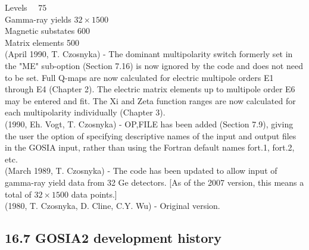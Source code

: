 \documentclass[10pt]{article}
\begin{document}
Levels $\quad 75$\\
Gamma-ray yields $32 \times 1500$\\
Magnetic substates 600\\
Matrix elements 500\\
(April 1990, T. Czosnyka) - The dominant multipolarity switch formerly set in the "ME" sub-option (Section 7.16) is now ignored by the code and does not need to be set. Full Q-maps are now calculated for electric multipole orders E1 through E4 (Chapter 2). The electric matrix elements up to multipole order E6 may be entered and fit. The Xi and Zeta function ranges are now calculated for each multipolarity individually (Chapter 3).\\
(1990, Eh. Vogt, T. Czosnyka) - OP,FILE has been added (Section 7.9), giving the user the option of specifying descriptive names of the input and output files in the GOSIA input, rather than using the Fortran default names fort.1, fort.2, etc.\\
(March 1989, T. Czosnyka) - The code has been updated to allow input of gamma-ray yield data from 32 Ge detectors. [As of the 2007 version, this means a total of $32 \times 1500$ data points.]\\
(1980, T. Czosnyka, D. Cline, C.Y. Wu) - Original version.

\subsection*{16.7 GOSIA2 development history}
\end{document}
